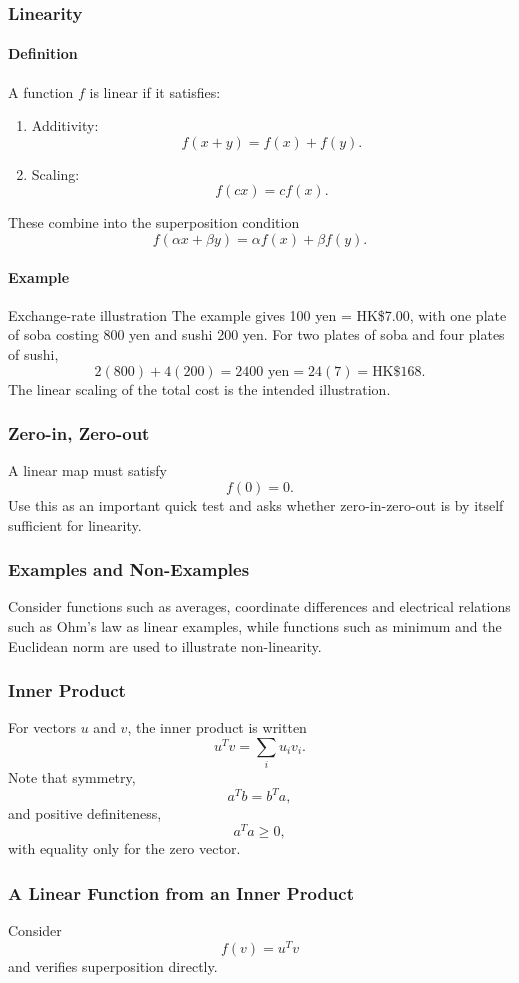 \documentclass[12pt]{article}
\newcommand{\Definition}{\paragraph{Definition}}
\newcommand{\Example}{\paragraph{Example}}
\begin{document}
\subsubsection{Linearity}
\Definition A function $f$ is linear if it satisfies:
\begin{enumerate}
    \item Additivity:
    \[
f(x+y)=f(x)+f(y).
    \]
    \item Scaling:
    \[
f(cx)=cf(x).
    \]
\end{enumerate}
These combine into the superposition condition
\[
f(\alpha x+\beta y)=\alpha f(x)+\beta f(y).
\]

\Example{Exchange-rate illustration}
The example gives 100 yen = HK\$7.00, with one plate of soba costing 800 yen and sushi 200 yen. For two plates of soba and four plates of sushi,
\[
2(800)+4(200)=2400\text{ yen}=24(7)=\text{HK\$168}.
\]
The linear scaling of the total cost is the intended illustration.

\subsubsection{Zero-in, Zero-out}
A linear map must satisfy
\[
f(0)=0.
\]
Use this as an important quick test and asks whether zero-in-zero-out is by itself sufficient for linearity.

\subsubsection{Examples and Non-Examples}
Consider functions such as averages, coordinate differences and electrical relations such as Ohm's law as linear examples, while functions such as minimum and the Euclidean norm are used to illustrate non-linearity.

\subsubsection{Inner Product}
For vectors $u$ and $v$, the inner product is written
\[
u^Tv=\sum_i u_iv_i.
\]
Note that symmetry,
\[
a^Tb=b^Ta,
\]
and positive definiteness,
\[
a^Ta\ge0,
\]
with equality only for the zero vector.

\subsubsection{A Linear Function from an Inner Product}
Consider
\[
f(v)=u^Tv
\]
and verifies superposition directly.
\end{document}
